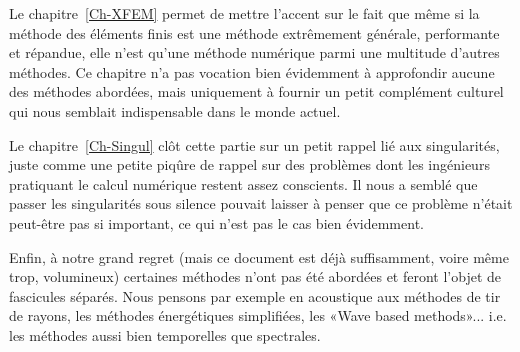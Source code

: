 \medskip
Le chapitre~\ref{Ch-XFEM} permet de mettre l'accent sur le fait que même si la méthode des éléments finis est une méthode extrêmement générale, performante et répandue, elle n'est qu'une méthode numérique parmi une multitude d'autres méthodes.
Ce chapitre n'a pas vocation bien évidemment à approfondir aucune des méthodes abordées, mais uniquement à fournir un petit complément culturel qui nous semblait indispensable dans le monde actuel.

\medskip
Le chapitre~\ref{Ch-Singul} clôt cette partie sur un petit rappel lié aux singularités, juste comme une petite piqûre de rappel sur des problèmes dont les ingénieurs pratiquant le calcul numérique restent assez conscients. Il nous a semblé que passer les singularités sous silence pouvait laisser à penser que ce problème n'était peut-être pas si important, ce qui n'est pas le cas bien évidemment.


\medskip
Enfin, à notre grand regret (mais ce document est déjà suffisamment, voire même trop, volumineux) certaines méthodes n'ont pas été abordées et feront l'objet de fascicules séparés.
Nous pensons par exemple en acoustique aux méthodes de tir de rayons, les méthodes énergétiques simplifiées, les «Wave based methods»... i.e. les méthodes aussi bien temporelles que spectrales.



